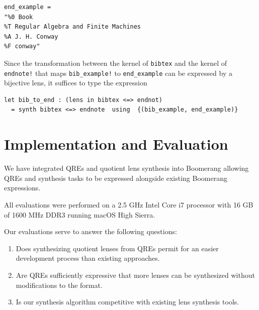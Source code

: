 \documentclass{svproc}
\newcommand{\cd}[1]{\lstinline[backgroundcolor=\color{white}]$#1$}
\begin{document}
\begin{lstlisting}
end_example = 
"%0 Book
%T Regular Algebra and Finite Machines
%A J. H. Conway
%F conway"
\end{lstlisting}

Since the transformation between the kernel of \cd{bibtex} and the kernel of
\cd{endnote!} that maps \cd{bib_example!} to \cd{end_example} can be
expressed by a bijective lens, it suffices to type the expression

\begin{lstlisting}
let bib_to_end : (lens in bibtex <=> endnot) 
  = synth bibtex <=> endnote  using  {(bib_example, end_example)}
\end{lstlisting}

\section{Implementation and Evaluation}
\label{impl}


We have integrated QREs and quotient lens synthesis into Boomerang allowing QREs
and synthesis tasks to be expressed alongside existing Boomerang expressions.

All evaluations were performed on a 2.5 GHz Intel Core i7 processor with 16 GB
of 1600 MHz DDR3 running macOS High Sierra.

Our evaluations serve to answer the following questions:
\begin{enumerate}
\item Does synthesizing quotient lenses from QREs permit for an easier
  development process than existing approaches.

\item Are QREs sufficiently expressive that more lenses can be synthesized
  without modifications to the format. 

\item Is our synthesis algorithm competitive with existing lens synthesis
  tools.
\end{enumerate}
\end{document}

